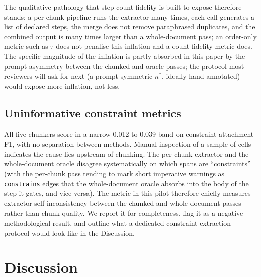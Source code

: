 \documentclass[make,article,submit,oneauthor,pdftex]{Definitions/mdpi}
\begin{document}
The qualitative pathology that step-count fidelity is built to expose
therefore stands: a per-chunk pipeline runs the extractor many times,
each call generates a list of declared steps, the merge does not
remove paraphrased duplicates, and the combined output is many times
larger than a whole-document pass; an order-only metric such as $\tau$
does not penalise this inflation and a count-fidelity metric does.
The specific magnitude of the inflation is partly absorbed in this
paper by the prompt asymmetry between the chunked and oracle passes;
the protocol most reviewers will ask for next (a prompt-symmetric
$n^{*}$, ideally hand-annotated) would expose more inflation, not
less.

\subsection{Uninformative constraint metrics}

All five chunkers score in a narrow 0.012 to 0.039 band on
constraint-attachment F1, with no separation between methods. Manual
inspection of a sample of cells indicates the cause lies upstream of
chunking. The per-chunk extractor and the whole-document oracle
disagree systematically on which spans are ``constraints'' (with the
per-chunk pass tending to mark short imperative warnings as
\texttt{constrains} edges that the whole-document oracle absorbs into
the body of the step it gates, and vice versa). The metric in this
pilot therefore chiefly measures extractor self-inconsistency between
the chunked and whole-document passes rather than chunk quality. We
report it for completeness, flag it as a negative methodological
result, and outline what a dedicated constraint-extraction protocol
would look like in the Discussion.

\section{Discussion}\label{sec:discussion}
\end{document}
